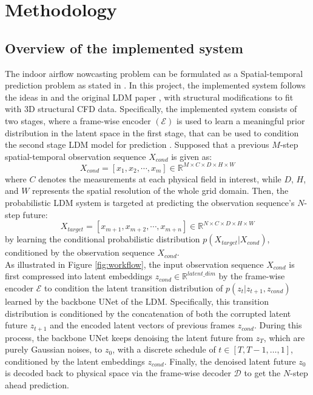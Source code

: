 \documentclass[final-report]{article-template}
\begin{document}
\section{Methodology}
\subsection{Overview of the implemented system}
\label{meth:overview}
The indoor airflow nowcasting problem can be formulated as a Spatial-temporal prediction problem as stated in \cite{gao2024prediff, yang2023denoising, yang2024survey}. In this project, the implemented system follows the ideas in \cite{gao2024prediff} and the original LDM paper \cite{rombach2022highresolution}, with structural modifications to fit with 3D structural CFD data. Specifically, the implemented system consists of two stages, where a frame-wise encoder $(\mathcal{E})$ is used to learn a meaningful prior distribution in the latent space in the first stage, that can be used to condition the second stage LDM model for prediction \cite{rombach2022highresolution}. Supposed that a previous $M$-step spatial-temporal observation sequence $X_{cond}$ is given as:
\begin{equation}
    X_{cond} = [x_1, x_2, \cdots, x_m] \in \mathbb{R}^{M \times C \times D \times H \times W}
\end{equation}
where $C$ denotes the measurements at each physical field in interest, while $D$, $H$, and $W$ represents the spatial resolution of the whole grid domain. Then, the probabilistic LDM system is targeted at predicting the observation sequence's $N$-step future: 
\begin{equation}
    X_{target}=[x_{m+1}, x_{m+2}, \cdots, x_{m+n}] \in \mathbb{R}^{N \times C \times D \times H \times W}
\end{equation}
by learning the conditional probabilistic distribution $p(X_{target} | X_{cond})$, conditioned by the observation sequence $X_{cond}$. \\

As illustrated in Figure \ref{fig:workflow}, the input observation sequence $X_{cond}$ is first compressed into latent embeddings $z_{cond} \in \mathbb{R}^{latent\_dim}$ by the frame-wise encoder $\mathcal{E}$ to condition the latent transition distribution of $p(z_t | z_{t+1}, z_{cond})$ learned by the backbone UNet of the LDM. Specifically, this transition distribution is conditioned by the concatenation of both the corrupted latent future $z_{t+1}$ and the encoded latent vectors of previous frames $z_{cond}$. During this process, the backbone UNet keeps denoising the latent future from $z_T$, which are purely Gaussian noises, to $z_0$, with a discrete schedule of $t \in [T, T-1, \dots, 1]$, conditioned by the latent embeddings $z_{cond}$. Finally, the denoised latent future $z_0$ is decoded back to physical space via the frame-wise decoder $\mathcal{D}$ to get the $N$-step ahead prediction. \\
\end{document}
